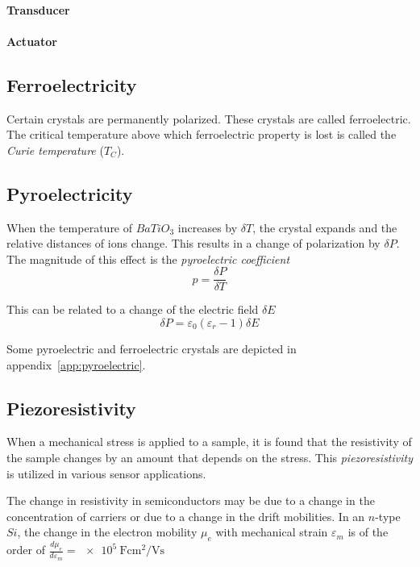 \paragraph{Transducer}

\paragraph{Actuator}

\subsection{Ferroelectricity}
Certain crystals are permanently polarized. 
These crystals are called ferroelectric.
The critical temperature above which ferroelectric property is lost is called
the \emph{Curie temperature} ($T_C$).

\subsection{Pyroelectricity}
When the temperature of $BaTiO_3$ increases by $\delta T$, the crystal expands
and the relative distances of ions change. This results in a change of 
polarization by $\delta P$. The magnitude of this effect is the 
\emph{pyroelectric coefficient}
\begin{equation}
    p = \frac{\delta P}{\delta T}
\end{equation}

This can be related to a change of the electric field $\delta E$
\begin{equation}
    \delta P = \varepsilon_0 (\varepsilon_r - 1) \delta E
\end{equation}

Some pyroelectric and ferroelectric crystals are depicted in appendix~\ref{app:pyroelectric}.

\subsection{Piezoresistivity}
When a mechanical stress is applied to a sample, it is found that the
resistivity of the sample changes by an amount that depends on the stress.
This \emph{piezoresistivity} is utilized in various sensor applications.

The change in resistivity in semiconductors may be due to a change in the
concentration of carriers or due to a change in the drift mobilities.
In an $n$-type $Si$, the change in the electron mobility $\mu_e$ with
mechanical strain $\varepsilon_m$ is of the order of
$\frac{d\mu_e}{d\varepsilon_m} = \SI{e5}{\farad\centi\meter\squared\per\volt\second}$

